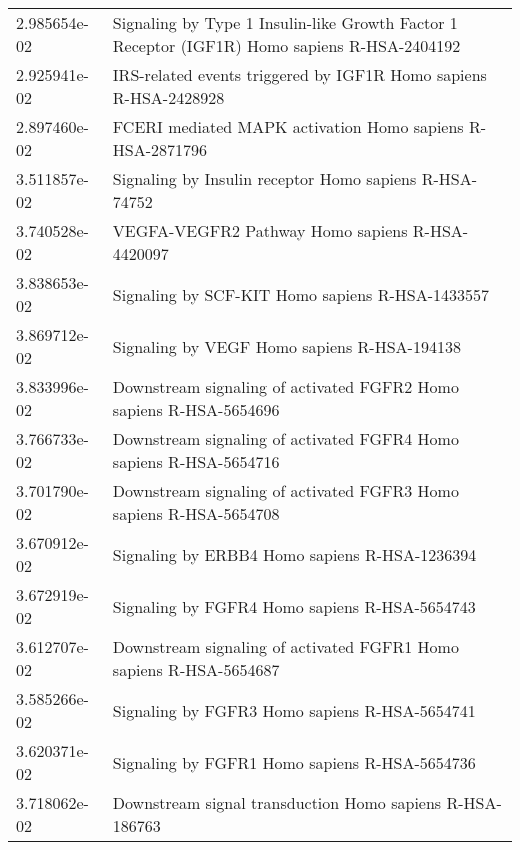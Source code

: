 \begin{longtable}{p{2.4cm}p{14.5cm}}
             2.985654e-02 &  Signaling by Type 1 Insulin-like Growth Factor 1 Receptor (IGF1R) Homo sapiens R-HSA-2404192 \\
             2.925941e-02 &                              IRS-related events triggered by IGF1R Homo sapiens R-HSA-2428928 \\
             2.897460e-02 &                                     FCERI mediated MAPK activation Homo sapiens R-HSA-2871796 \\
             3.511857e-02 &                                        Signaling by Insulin receptor Homo sapiens R-HSA-74752 \\
             3.740528e-02 &                                               VEGFA-VEGFR2 Pathway Homo sapiens R-HSA-4420097 \\
             3.838653e-02 &                                               Signaling by SCF-KIT Homo sapiens R-HSA-1433557 \\
             3.869712e-02 &                                                   Signaling by VEGF Homo sapiens R-HSA-194138 \\
             3.833996e-02 &                            Downstream signaling of activated FGFR2 Homo sapiens R-HSA-5654696 \\
             3.766733e-02 &                            Downstream signaling of activated FGFR4 Homo sapiens R-HSA-5654716 \\
             3.701790e-02 &                            Downstream signaling of activated FGFR3 Homo sapiens R-HSA-5654708 \\
             3.670912e-02 &                                                 Signaling by ERBB4 Homo sapiens R-HSA-1236394 \\
             3.672919e-02 &                                                 Signaling by FGFR4 Homo sapiens R-HSA-5654743 \\
             3.612707e-02 &                            Downstream signaling of activated FGFR1 Homo sapiens R-HSA-5654687 \\
             3.585266e-02 &                                                 Signaling by FGFR3 Homo sapiens R-HSA-5654741 \\
             3.620371e-02 &                                                 Signaling by FGFR1 Homo sapiens R-HSA-5654736 \\
             3.718062e-02 &                                      Downstream signal transduction Homo sapiens R-HSA-186763 \\

\end{longtable}
